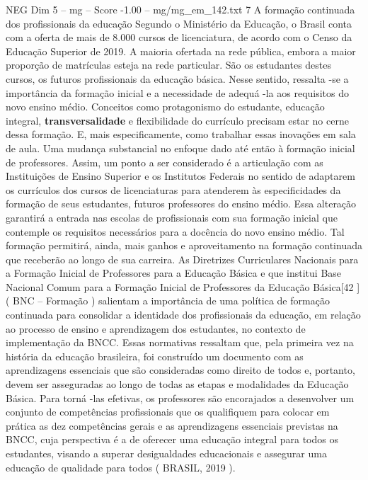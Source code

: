 \begin{textsample}{NEG Dim 5 – mg – Score -1.00 – mg/mg\_em\_142.txt}  \label{ex:f5_neg_109}
7 A formação continuada dos profissionais da educação Segundo o Ministério da Educação, o Brasil conta com a oferta de mais de 8.000 cursos de licenciatura, de acordo com o Censo da Educação Superior de 2019.
A maioria ofertada na rede pública, embora a maior proporção de matrículas esteja na rede particular.
São os estudantes destes cursos, os futuros profissionais da educação básica.
Nesse sentido, ressalta -se a importância da formação inicial e a necessidade de adequá -la aos requisitos do novo ensino médio.
Conceitos como protagonismo do estudante, educação integral, \textbf{transversalidade} e flexibilidade do currículo precisam estar no cerne dessa formação.
E, mais especificamente, como trabalhar essas inovações em sala de aula.
Uma mudança substancial no enfoque dado até então à formação inicial de professores.
Assim, um ponto a ser considerado é a articulação com as Instituições de Ensino Superior e os Institutos Federais no sentido de adaptarem os currículos dos cursos de licenciaturas para atenderem às especificidades da formação de seus estudantes, futuros professores do ensino médio.
Essa alteração garantirá a entrada nas escolas de profissionais com sua formação inicial que contemple os requisitos necessários para a docência do novo ensino médio.
Tal formação permitirá, ainda, mais ganhos e aproveitamento na formação continuada que receberão ao longo de sua carreira.
As Diretrizes Curriculares Nacionais para a Formação Inicial de Professores para a Educação Básica e que institui Base Nacional Comum para a Formação Inicial de Professores da Educação Básica[42 ] ( BNC – Formação ) salientam a importância de uma política de formação continuada para consolidar a identidade dos profissionais da educação, em relação ao processo de ensino e aprendizagem dos estudantes, no contexto de implementação da BNCC.
Essas normativas ressaltam que, pela primeira vez na história da educação brasileira, foi construído um documento com as aprendizagens essenciais que são consideradas como direito de todos e, portanto, devem ser asseguradas ao longo de todas as etapas e modalidades da Educação Básica.
Para torná -las efetivas, os professores são encorajados a desenvolver um conjunto de competências profissionais que os qualifiquem para colocar em prática as dez competências gerais e as aprendizagens essenciais previstas na BNCC, cuja perspectiva é a de oferecer uma educação integral para todos os estudantes, visando a superar desigualdades educacionais e assegurar uma educação de qualidade para todos ( BRASIL, 2019 ).

\end{textsample}
